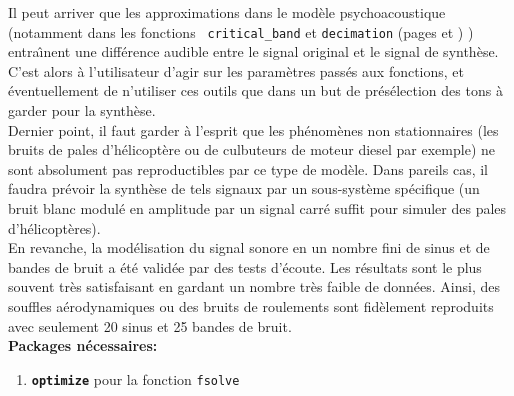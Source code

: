 Il peut arriver que les approximations dans le mod{\`e}le
psychoacoustique (notamment dans les fonctions {\tt
critical\_band} et {\tt decimation} (pages \pageref{criticalband}
et \pageref{decimation}) ) entra{\^\i}nent une diff{\'e}rence audible entre
le signal original et le signal de synth{\`e}se. C'est alors {\`a}
l'utilisateur d'agir sur les param{\`e}tres pass{\'e}s aux fonctions, et
{\'e}ventuellement de n'utiliser ces outils que dans un but de
pr{\'e}s{\'e}lection des tons {\`a} garder pour la synth{\`e}se.\\

Dernier point, il faut garder {\`a} l'esprit que les ph{\'e}nom{\`e}nes non
stationnaires (les bruits de pales d'h{\'e}licopt{\`e}re ou de culbuteurs
de moteur diesel par exemple) ne sont absolument pas
reproductibles par ce type de mod{\`e}le. Dans pareils cas, il faudra
pr{\'e}voir la synth{\`e}se de tels signaux par un sous-syst{\`e}me sp{\'e}cifique
(un bruit blanc modul{\'e} en amplitude par un signal carr{\'e} suffit
pour simuler des pales d'h{\'e}licopt{\`e}res).\\

En revanche, la mod{\'e}lisation du signal sonore en un nombre fini de
sinus et de bandes de bruit a {\'e}t{\'e} valid{\'e}e par des tests d'{\'e}coute.
Les r{\'e}sultats sont le plus souvent tr{\`e}s satisfaisant en gardant un
nombre tr{\`e}s faible de donn{\'e}es. Ainsi, des souffles a{\'e}rodynamiques
ou des bruits de roulements sont fid{\`e}lement reproduits avec
seulement 20 sinus et 25 bandes de bruit.\\

\textbf{Packages \matlab n{\'e}cessaires:}
\begin{enumerate}

        \item \textbf{\tt optimize} pour la fonction {\tt fsolve}

\end{enumerate}
